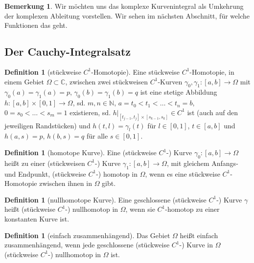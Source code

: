 \documentclass[11pt,titlepage]{article}
\theoremstyle{definition}
\newtheorem{definition}[theorem]{Definition}
\newtheorem{remark}{Bemerkung}
\theoremstyle{remark}
\begin{document}
	\begin{remark}
		Wir möchten uns das komplexe Kurvenintegral als Umkehrung der komplexen Ableitung 
		vorstellen. Wir sehen im nächsten Abschnitt, für welche Funktionen das geht.
	\end{remark}
	
	\subsection{Der Cauchy-Integralsatz}
	
	\begin{definition}[stückweise $C^1$-Homotopie]
		Eine stückweise $C^1$-Homotopie, in einem Gebiet $\Omega\subset\mathbb{C}$, zwischen 
		zwei stückweisen $C^1$-Kurven $\gamma_0,\gamma_1:[a,b]\to\Omega$ mit $\gamma_0 (a)=
		\gamma_1 (a)=p$, $\gamma_0 (b)=\gamma_1 (b)=q$ ist eine stetige Abbildung 
		$h:[a,b]\times [0,1]\to\Omega$, sd. $m,n\in\mathbb{N}$, $a=t_0 <t_1 <\ldots <t_n =b$, 
		$0=s_0 <\ldots <s_m =1$ existieren, sd. $h|_{[t_{j-1},t_j]\times [s_{k-1},s_k]}\in C^1$ ist 
		(auch auf den jeweiligen Randstücken) und $h(t,l)=\gamma_l (t)$ für $l\in [0,1]$, $t\in [a,b]$ und 
		$h(a,s)=p$, $h(b,s)=q$ für alle $s\in [0,1]$.
	\end{definition}
	
	\begin{definition}[homotope Kurve]
		Eine (stückweise $C^1$-) Kurve $\gamma_0 :[a,b]\to\Omega$ heißt zu einer 
		(stückweisen $C^1$-) Kurve $\gamma_1 :[a,b]\to\Omega$, mit gleichem Anfangs- und Endpunkt, 
		(stückweise $C^1$-) homotop in $\Omega$, wenn es eine stückweise $C^1$-Homotopie 
		zwischen ihnen in $\Omega$ gibt.
	\end{definition}
	
	\begin{definition}[nullhomotope Kurve]
		Eine geschlossene (stückweise $C^1$-) Kurve $\gamma$ heißt (stückweise $C^1$-) nullhomotop 
		in $\Omega$, wenn sie $C^1$-homotop zu einer konstanten Kurve ist.
	\end{definition}
	
	\begin{definition}[einfach zusammenhängend]
		Das Gebiet $\Omega$ heißt einfach zusammenhängend, wenn jede geschlossene (stückweise 
		$C^1$-) Kurve in $\Omega$ (stückweise $C^1$-) nullhomotop in $\Omega$ ist.
	\end{definition}
	
\end{document}
